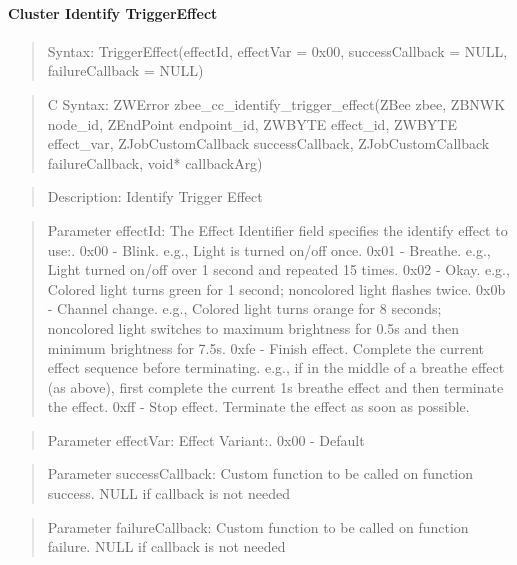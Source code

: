 \paragraph{Cluster Identify TriggerEffect}
\begin{quote}Syntax: TriggerEffect(effectId, effectVar = 0x00, successCallback = NULL, failureCallback = NULL)\end{quote}
\begin{quote}C Syntax: ZWError zbee\_cc\_identify\_trigger\_effect(ZBee zbee, ZBNWK node\_id, ZEndPoint endpoint\_id, ZWBYTE effect\_id, ZWBYTE effect\_var, ZJobCustomCallback successCallback, ZJobCustomCallback failureCallback, void* callbackArg)\end{quote}
\begin{quote}Description: Identify Trigger Effect\end{quote}
\begin{quote}Parameter effectId: The Effect Identifier field specifies the identify effect to use:. 0x00 - Blink. e.g., Light is turned on/off once. 0x01 - Breathe. e.g., Light turned on/off over 1 second and repeated 15 times. 0x02 - Okay. e.g., Colored light turns green for 1 second; noncolored light flashes twice. 0x0b - Channel change. e.g., Colored light turns orange for 8 seconds; noncolored light switches to maximum brightness for 0.5s and then minimum brightness for 7.5s. 0xfe - Finish effect. Complete the current effect sequence before terminating. e.g., if in the middle of a breathe effect (as above), first complete the current 1s breathe effect and then terminate the effect. 0xff - Stop effect. Terminate the effect as soon as possible. \end{quote}
\begin{quote}Parameter effectVar: Effect Variant:. 0x00 - Default\end{quote}
\begin{quote}Parameter successCallback: Custom function to be called on function success. NULL if callback is not needed\end{quote}
\begin{quote}Parameter failureCallback: Custom function to be called on function failure. NULL if callback is not needed\end{quote}


